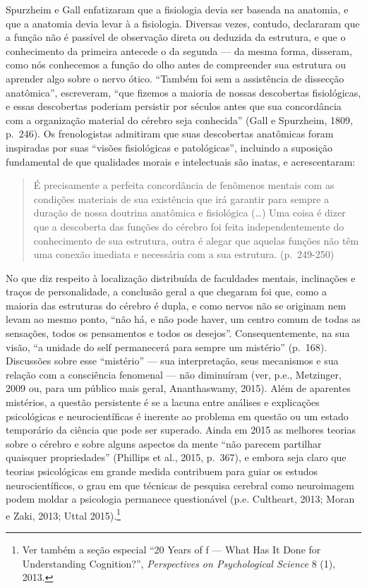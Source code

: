 Spurzheim e Gall enfatizaram que a fisiologia devia ser baseada na
anatomia, e que a anatomia devia levar à a fisiologia. Diversas vezes,
contudo, declararam que a função não é passível de observação direta ou
deduzida da estrutura, e que o conhecimento da primeira antecede o da
segunda --- da mesma forma, disseram, como nós conhecemos a função do
olho antes de compreender sua estrutura ou aprender algo sobre o nervo
ótico. ``Também foi sem a assistência de dissecção anatômica'',
escreveram, ``que fizemos a maioria de nossas descobertas fisiológicas,
e essas descobertas poderiam persistir por séculos antes que sua
concordância com a organização material do cérebro seja conhecida''
(Gall e Spurzheim, 1809, p.~246). Os frenologistas admitiram que suas
descobertas anatômicas foram inspiradas por suas ``visões fisiológicas e
patológicas'', incluindo a suposição fundamental de que qualidades
morais e intelectuais são inatas, e acrescentaram:

\begin{quote}
É precisamente a perfeita concordância de fenômenos mentais com as
condições materiais de sua existência que irá garantir para sempre a
duração de nossa doutrina anatômica e fisiológica (\ldots{}) Uma coisa é
dizer que a descoberta das funções do cérebro foi feita
independentemente do conhecimento de sua estrutura, outra é alegar que
aquelas funções não têm uma conexão imediata e necessária com a sua
estrutura. (p.~249-250)
\end{quote}

No que diz respeito à localização distribuída de faculdades mentais,
inclinações e traços de personalidade, a conclusão geral a que chegaram
foi que, como a maioria das estruturas do cérebro é dupla, e como nervos
não se originam nem levam ao mesmo ponto, ``não há, e não pode haver, um
centro comum de todas as sensações, todos os pensamentos e todos os
desejos''. Consequentemente, na sua visão, ``a unidade do self
permanecerá para sempre um mistério'' (p.~168). Discussões sobre esse
``mistério'' --- sua interpretação, seus mecanismos e sua relação com a
consciência fenomenal --- não diminuíram (ver, p.e., Metzinger, 2009 ou,
para um público mais geral, Ananthaswamy, 2015). Além de aparentes
mistérios, a questão persistente é se a lacuna entre análises e
explicações psicológicas e neurocientíficas é inerente ao problema em
questão ou um estado temporário da ciência que pode ser superado. Ainda
em 2015 as melhores teorias sobre o cérebro e sobre alguns aspectos da
mente ``não parecem partilhar quaisquer propriedades'' (Phillips et al.,
2015, p.~367), e embora seja claro que teorias psicológicas em grande
medida contribuem para guiar os estudos neurocientíficos, o grau em que
técnicas de pesquisa cerebral como neuroimagem podem moldar a psicologia
permanece questionável (p.e. Cultheart, 2013; Moran e Zaki, 2013; Uttal
2015).\footnote[10]{Ver também a seção especial ``20 Years of f --- What Has It
Done for Understanding Cognition?'', \emph{Perspectives on Psychological
Science} 8 (1), 2013.}

